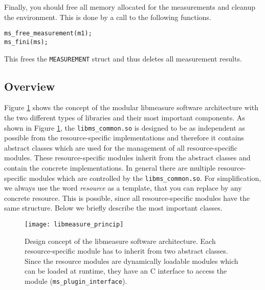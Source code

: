 Finally, you should free all memory allocated for the measurements and cleanup the environment. This is done by a call to the following functions.
\begin{lstlisting}[caption={Environment cleanup and freeing memory.},label=lst:cleanupMS]
ms_free_measurement(m1);
ms_fini(ms);
\end{lstlisting}
This frees the \texttt{MEASUREMENT} struct and thus deletes all measurement results.


\subsection{Overview}
Figure \ref{fig:libmeasure_principle} shows the concept of the modular libmeasure software architecture with the two different types of libraries and their most important components. As shown in Figure \ref{fig:libmeasure_principle}, the \texttt{libms\_common.so} is designed to be as independent as possible from the resource-specific implementations and therefore it contains abstract classes which are used for the management of all resource-specific modules. These resource-specific modules inherit from the abstract classes and contain the concrete implementations. In general there are multiple resource-specific modules which are controlled by the \texttt{libms\_common.so}. For simplification, we always use the word \textit{resource} as a template, that you can replace by any concrete resource. This is possible, since all resource-specific modules have the same structure. Below we briefly describe the most important classes.

\begin{figure}
\begin{center}
\texttt{[image: libmeasure\_princip]} 
\caption{Design concept of the libmeasure software architecture. Each resource-specific module has to inherit from two abstract classes. Since the resource modules are dynamically loadable modules which can be loaded at runtime, they have an C interface to access the module (\texttt{ms\_plugin\_interface}).}
\label{fig:libmeasure_principle}
\end{center}
\end{figure}

